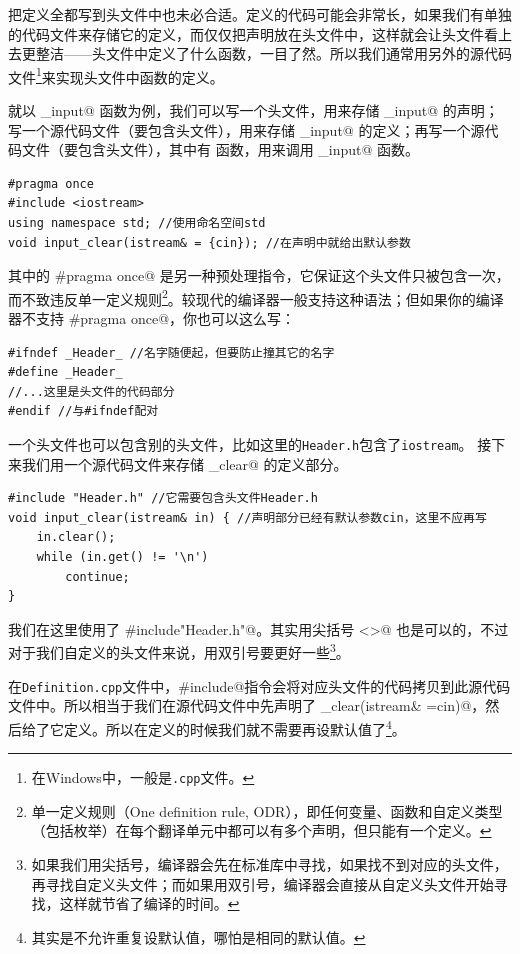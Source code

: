 把定义全都写到头文件中也未必合适。定义的代码可能会非常长，如果我们有单独的代码文件来存储它的定义，而仅仅把声明放在头文件中，这样就会让头文件看上去更整洁——头文件中定义了什么函数，一目了然。所以我们通常用另外的源代码文件\footnote{在Windows中，一般是\texttt{.cpp}文件。}来实现头文件中函数的定义。\par
就以 \lstinline@clear_input@ 函数为例，我们可以写一个头文件，用来存储 \lstinline@clear_input@ 的声明；写一个源代码文件（要包含头文件），用来存储 \lstinline@clear_input@ 的定义；再写一个源代码文件（要包含头文件），其中有 \lstinline@main@ 函数，用来调用 \lstinline@clear_input@ 函数。\par
\begin{lstlisting}[caption=\texttt{Header.h}]
#pragma once
#include <iostream>
using namespace std; //使用命名空间std
void input_clear(istream& = {cin}); //在声明中就给出默认参数
\end{lstlisting}
其中的 \lstinline@#pragma once@ 是另一种预处理指令，它保证这个头文件只被包含一次，而不致违反单一定义规则\footnote{单一定义规则（One definition rule, ODR），即任何变量、函数和自定义类型（包括枚举）在每个翻译单元中都可以有多个声明，但只能有一个定义。}。较现代的编译器一般支持这种语法；但如果你的编译器不支持 
\lstinline@#pragma once@，你也可以这么写：
\begin{lstlisting}
#ifndef _Header_ //名字随便起，但要防止撞其它的名字
#define _Header_ 
//...这里是头文件的代码部分
#endif //与#ifndef配对
\end{lstlisting}\par
一个头文件也可以包含别的头文件，比如这里的\texttt{Header.h}包含了\texttt{iostream}。
接下来我们用一个源代码文件来存储 \lstinline@input_clear@ 的定义部分。
\begin{lstlisting}[caption=\texttt{Definition.cpp}]
#include "Header.h" //它需要包含头文件Header.h
void input_clear(istream& in) { //声明部分已经有默认参数cin，这里不应再写
    in.clear();
    while (in.get() != '\n')
        continue;
}
\end{lstlisting}
我们在这里使用了 \lstinline@#include"Header.h"@。其实用尖括号 \lstinline@<>@ 也是可以的，不过对于我们自定义的头文件来说，用双引号要更好一些\footnote{如果我们用尖括号，编译器会先在标准库中寻找，如果找不到对应的头文件，再寻找自定义头文件；而如果用双引号，编译器会直接从自定义头文件开始寻找，这样就节省了编译的时间。}。\par
在\texttt{Definition.cpp}文件中，\lstinline@#include@指令会将对应头文件的代码拷贝到此源代码文件中。所以相当于我们在源代码文件中先声明了 \lstinline@input_clear(istream& ={cin})@，然后给了它定义。所以在定义的时候我们就不需要再设默认值了\footnote{其实是不允许重复设默认值，哪怕是相同的默认值。}。\par

